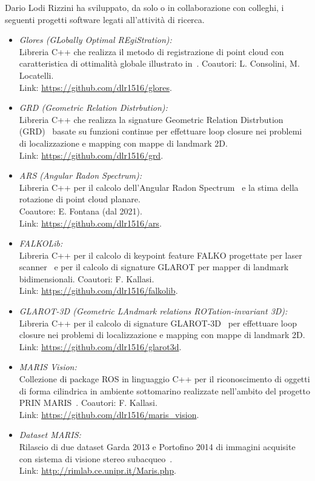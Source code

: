 \documentclass[11pt]{article}
\newcommand{\ITEMDATE}[1]{\item \textit{#1:}\\}
\begin{document}
\begin{itemize}
Dario Lodi Rizzini ha sviluppato, da solo o in collaborazione con colleghi, i seguenti progetti software legati all'attivit\`a di ricerca.
\begin{itemize}
\ITEMDATE{Glores (GLobally Optimal REgiStration)}{
  Libreria C++ che realizza il metodo di registrazione di point cloud con caratteristica di ottimalit\`a globale illustrato in~\cite{consolini2020pr}. 
  Coautori: L. Consolini, M. Locatelli. \\
  Link: \url{https://github.com/dlr1516/glores}.
}
\ITEMDATE{GRD (Geometric Relation Distrbution)}{
  Libreria C++ che realizza la signature Geometric Relation Distrbution (GRD)~\cite{lodirizzini2019ral} basate su funzioni continue per effettuare loop closure nei problemi di localizzazione e mapping con mappe di landmark 2D. \\
  Link: \url{https://github.com/dlr1516/grd}.
}
\ITEMDATE{ARS (Angular Radon Spectrum)}{
  Libreria C++ per il calcolo dell'Angular Radon Spectrum~\cite{lodirizzini2018pr, lodirizzini2022ral} e la stima della rotazione di point cloud planare.\\
  Coautore: E. Fontana (dal 2021). \\
  Link: \url{https://github.com/dlr1516/ars}.
}
\ITEMDATE{FALKOLib}{
  Libreria C++ per il calcolo di keypoint feature FALKO progettate per laser scanner~\cite{kallasi2016ral} e per il calcolo di signature GLAROT per mapper di landmark bidimensionali.
  Coautori: F. Kallasi.\\
  Link: \url{https://github.com/dlr1516/falkolib}.
}
\ITEMDATE{GLAROT-3D (Geometric LAndmark relations ROTation-invariant 3D)}{
  Libreria C++ per il calcolo di signature GLAROT-3D~\cite{lodirizzini2017iros} per effettuare loop closure nei problemi di localizzazione e mapping con mappe di landmark 2D.\\
  Link: \url{https://github.com/dlr1516/glarot3d}.
}
\ITEMDATE{MARIS Vision}{
  Collezione di package ROS in linguaggio C++ per il riconoscimento di oggetti di forma cilindrica in ambiente sottomarino realizzate nell'ambito del progetto PRIN MARIS~\cite{lodirizzini2017caee, simetti2018joe}.
  Coautori: F. Kallasi.\\
  Link: \url{https://github.com/dlr1516/maris\_vision}.
}
\ITEMDATE{Dataset MARIS}{ 
  Rilascio di due dataset Garda 2013 e Portofino 2014 di immagini acquisite con sistema di visione stereo subacqueo~\cite{oleari2015oceans, lodirizzini2015ijars, oleari2014ifac}. \\
  Link: \url{http://rimlab.ce.unipr.it/Maris.php}.
}
\end{itemize}


\end{itemize}
\end{document}
